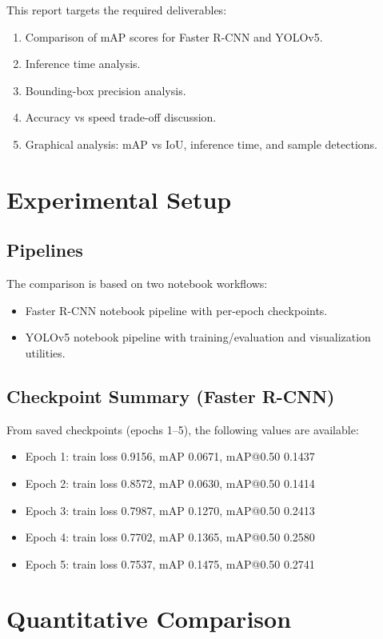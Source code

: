 \documentclass[conference]{IEEEtran}
\begin{document}
This report targets the required deliverables:
\begin{enumerate}
    \item Comparison of mAP scores for Faster R-CNN and YOLOv5.
    \item Inference time analysis.
    \item Bounding-box precision analysis.
    \item Accuracy vs speed trade-off discussion.
    \item Graphical analysis: mAP vs IoU, inference time, and sample detections.
\end{enumerate}

\section{Experimental Setup}
\subsection{Pipelines}
The comparison is based on two notebook workflows:
\begin{itemize}
    \item Faster R-CNN notebook pipeline with per-epoch checkpoints.
    \item YOLOv5 notebook pipeline with training/evaluation and visualization utilities.
\end{itemize}

\subsection{Checkpoint Summary (Faster R-CNN)}
From saved checkpoints (epochs 1--5), the following values are available:
\begin{itemize}
    \item Epoch 1: train loss 0.9156, mAP 0.0671, mAP@0.50 0.1437
    \item Epoch 2: train loss 0.8572, mAP 0.0630, mAP@0.50 0.1414
    \item Epoch 3: train loss 0.7987, mAP 0.1270, mAP@0.50 0.2413
    \item Epoch 4: train loss 0.7702, mAP 0.1365, mAP@0.50 0.2580
    \item Epoch 5: train loss 0.7537, mAP 0.1475, mAP@0.50 0.2741
\end{itemize}

\section{Quantitative Comparison}
\end{document}

